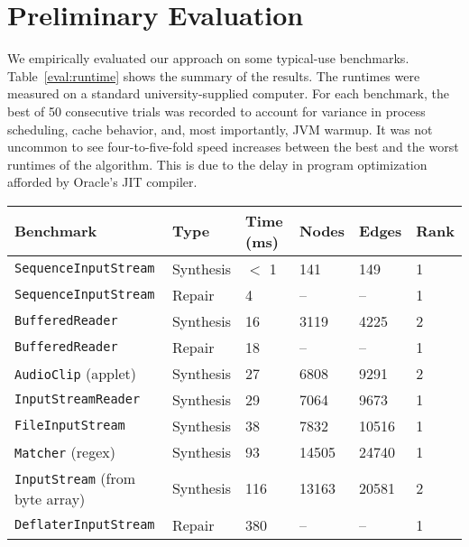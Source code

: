 \section{Preliminary Evaluation}
\label{sec:evaluation}

We empirically evaluated our approach on some typical-use benchmarks. Table~\ref{eval:runtime} shows the summary of the results. The runtimes were measured on a standard university-supplied computer. For each benchmark, the best of 50 consecutive trials was recorded to account for variance in process scheduling, cache behavior, and, most importantly, JVM warmup. It was not uncommon to see four-to-five-fold speed increases between the best and the worst runtimes of the algorithm. This is due to the delay in program optimization afforded by Oracle's JIT compiler.

\begin{table*}[t]
  \centering
  \begin{tabularx}{\linewidth}{| X | l | l | l | l | l |}
    \hline
    \textbf{Benchmark} & \textbf{Type} & \textbf{Time (ms)} & \textbf{Nodes} & \textbf{Edges} & \textbf{Rank} \\ \hline
	\texttt{SequenceInputStream} & Synthesis & $<$ 1 & 141   & 149   & 1 \\ \hline
	\texttt{SequenceInputStream} & Repair    & 4   & --    & --    & 1 \\ \hline
    \texttt{BufferedReader}      & Synthesis & 16  & 3119  & 4225  & 2 \\ \hline
    \texttt{BufferedReader}      & Repair    & 18  & --    & --    & 1 \\ \hline
    \texttt{AudioClip} (applet)  & Synthesis & 27  & 6808  & 9291  & 2 \\ \hline
    \texttt{InputStreamReader}   & Synthesis & 29  & 7064  & 9673  & 1 \\ \hline
    \texttt{FileInputStream}     & Synthesis & 38  & 7832  & 10516 & 1 \\ \hline
    \texttt{Matcher} (regex)     & Synthesis & 93  & 14505 & 24740 & 1 \\ \hline
    \texttt{InputStream} (from byte array) & Synthesis & 116 & 13163  & 20581  & 2 \\ \hline
    \texttt{DeflaterInputStream} & Repair    & 380 & -- & -- & 1 \\ \hline
  \end{tabularx}
  \caption{Typical-use runtimes in various benchmarks. ``Nodes'' and ``Edges'' refer to the size of the searched subgraph, and ``Rank'' indicates the correct expression's position among the results. The entire Java standard library was used to build the graph before running the benchmarks. Each test case was initialized with a small environment consisting of five variables.}
  \label{eval:runtime}
\end{table*}


